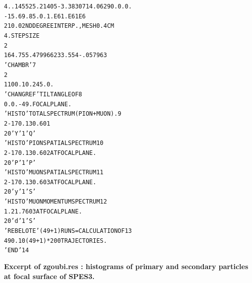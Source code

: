 \begin{alltt}
  4. .14552 5.21405 -3.38307 14.0629 0. 0. 0.                                   
  -15.  69.       85.  0.    1.E6  1.E6 1E6
  2 10.0                               2ND DEGREE INTERP., MESH 0.4 CM 
  4.                                   STEP SIZE                       
  2                                                                             
  164.755 .479966 233.554 -.057963                                              
  'CHAMBR'                                                               7      
  2                                                                             
  1   100. 10. 245.  0.                                                         
  'CHANGREF'                          TILT  ANGLE  OF                    8      
  0.   0.   -49.                      FOCAL  PLANE.                             
  'HISTO'                             TOTAL  SPECTRUM (PION + MUON).     9      
  2  -170.  130.  60  1                                                         
  20  'Y'  1  'Q'                                                               
  'HISTO'                             PION  SPATIAL  SPECTRUM           10      
  2  -170.  130.  60  2               AT  FOCAL  PLANE.                         
  20  'P'  1  'P'                                                               
  'HISTO'                             MUON  SPATIAL  SPECTRUM           11      
  2  -170.  130.  60  3               AT  FOCAL  PLANE.                         
  20  'y'  1  'S'                                                               
  'HISTO'                             MUON  MOMENTUM  SPECTRUM          12      
  1    .2   1.7   60  3               AT  FOCAL  PLANE.                         
  20  'd'  1  'S'                                                               
  'REBELOTE'                          (49+1)  RUNS =  CALCULATION  OF   13      
  49  0.1  0                          (49+1)*200  TRAJECTORIES.                 
  'END'                                                                 14      
\end{alltt}



\clearpage
\tiny
\twocolumn
\noindent \textbf{\normalsize Excerpt of zgoubi.res  : histograms of primary and secondary particles at focal surface of SPES3.}

